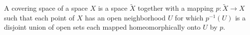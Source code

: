 A covering space of a space $X$ is a space $\tilde{X}$ together with a mapping $p: \tilde{X} \to X$ such that each point of $X$ has an open neighborhood $U$ for which $p^{-1}(U)$ is a disjoint union of open sets each mapped homeomorphically onto $U$ by $p$.
